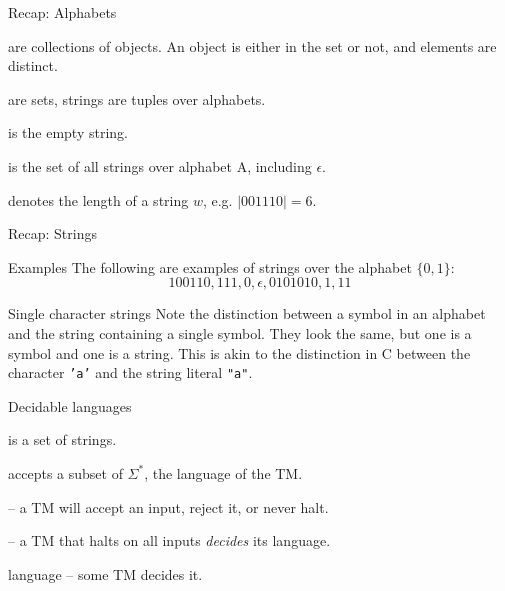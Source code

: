 \begin{frame}{Recap: Alphabets}

  \begin{description}[Alphabets]
    \setlength\itemsep{6mm}
    \item[Sets] are collections of objects. An object is either in the set or not, and elements are distinct.
    \item[Alphabets] are sets, strings are tuples over alphabets.
    \item[$\epsilon$] is the empty string.
    \item[$A^*$] is the set of all strings over alphabet A, including $\epsilon$.
    \item[$|w|$] denotes the length of a string $w$, e.g. $|001110|=6$.
  \end{description}
\end{frame}

\begin{frame}{Recap: Strings}
  \vspace{2mm}
  \begin{alertblock}{Examples}
    \vspace{2mm}
    The following are examples of strings over the alphabet $\{0,1\}$:
    $$100110, 111, 0, \epsilon, 0101010, 1, 11$$
  \end{alertblock}
  \vspace{2mm}
\begin{alertblock}{Single character strings}
  \vspace{2mm}
Note the distinction between a symbol in an alphabet and the string containing a single symbol.
They look the same, but one is a symbol and one is a string. 
This is akin to the distinction in C between the character \texttt{'a'} and the string literal \texttt{"a"}.
\end{alertblock}
\end{frame}


\begin{frame}{Decidable languages}
  \begin{description}
    \setlength\itemsep{6mm}
    \item[Language] is a set of strings.
    \item[TM] accepts a subset of $\Sigma^*$, the language of the TM.
    \item[Halting] -- a TM will accept an input, reject it, or never halt.
    \item[Decider] -- a TM that halts on all inputs \emph{decides} its language.
    \item[Decidable] language -- some TM decides it.
  \end{description}
\end{frame}


